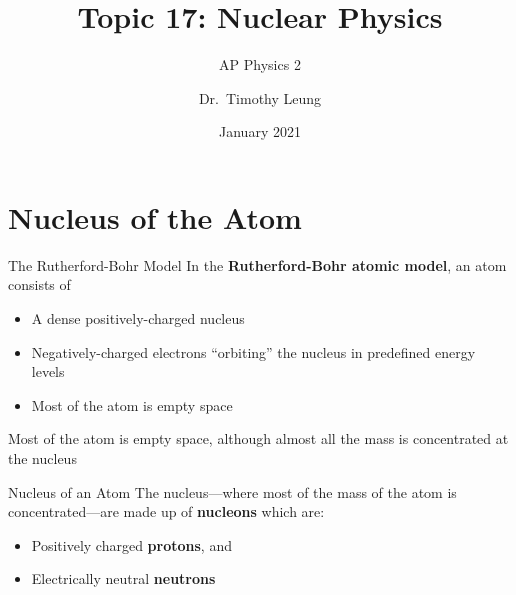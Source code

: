 \documentclass[12pt,compress,aspectratio=169]{beamer}
\title{Topic 17: Nuclear Physics}
\subtitle{AP Physics 2}
\author{Dr.\ Timothy Leung}
\institute{Olympiads School, Toronto, ON, Canada}
\date{January 2021}
\newcommand{\pic}[2]{\texttt{[image: \#2]}}
\begin{document}
\begin{frame}
  \titlepage
\end{frame}



\section{Nucleus of the Atom}

%


\begin{frame}{The Rutherford-Bohr Model}
  In the \textbf{Rutherford-Bohr atomic model}, an atom consists of
  \begin{itemize}
  \item A dense positively-charged nucleus
  \item Negatively-charged electrons ``orbiting'' the nucleus in predefined
    energy levels
  \item Most of the atom is empty space
  \end{itemize}
  Most of the atom is empty space, although almost all the mass is concentrated
  at the nucleus
\end{frame}



\begin{frame}{Nucleus of an Atom}
  The nucleus---where most of the mass of the atom is concentrated---are made
  up of \textbf{nucleons} which are:
  \begin{itemize}
  \item Positively charged \textbf{protons}, and 
  \item Electrically neutral \textbf{neutrons}
  \end{itemize}
\end{frame}
\end{document}
